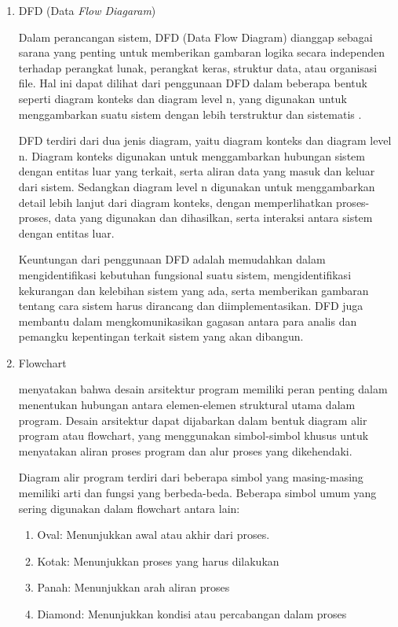\begin{enumerate}[leftmargin=1cm, itemindent=0.6cm,labelwidth=15pt, labelsep=5pt, listparindent=1cm,align=left]

    \item DFD (Data \textit{Flow Diagaram})

    Dalam perancangan sistem, DFD (Data Flow Diagram) dianggap sebagai sarana yang penting untuk memberikan gambaran logika secara independen terhadap perangkat lunak, perangkat keras, struktur data, atau organisasi file. Hal ini dapat dilihat dari penggunaan DFD dalam beberapa bentuk seperti diagram konteks dan diagram level n, yang digunakan untuk menggambarkan suatu sistem dengan lebih terstruktur dan sistematis \textcite{khotijah2016perancangan}.

    DFD terdiri dari dua jenis diagram, yaitu diagram konteks dan diagram level n. Diagram konteks digunakan untuk menggambarkan hubungan sistem dengan entitas luar yang terkait, serta aliran data yang masuk dan keluar dari sistem. Sedangkan diagram level n digunakan untuk menggambarkan detail lebih lanjut dari diagram konteks, dengan memperlihatkan proses-proses, data yang digunakan dan dihasilkan, serta interaksi antara sistem dengan entitas luar.

    Keuntungan dari penggunaan DFD adalah memudahkan dalam mengidentifikasi kebutuhan fungsional suatu sistem, mengidentifikasi kekurangan dan kelebihan sistem yang ada, serta memberikan gambaran tentang cara sistem harus dirancang dan diimplementasikan. DFD juga membantu dalam mengkomunikasikan gagasan antara para analis dan pemangku kepentingan terkait sistem yang akan dibangun.

    \item Flowchart

    menyatakan bahwa desain arsitektur program memiliki peran penting dalam menentukan hubungan antara elemen-elemen struktural utama dalam program. Desain arsitektur dapat dijabarkan dalam bentuk diagram alir program atau flowchart, yang menggunakan simbol-simbol khusus untuk menyatakan aliran proses program dan alur proses yang dikehendaki.

    Diagram alir program terdiri dari beberapa simbol yang masing-masing memiliki arti dan fungsi yang berbeda-beda. Beberapa simbol umum yang sering digunakan dalam flowchart antara lain:

    \begin{enumerate}
        \item Oval: Menunjukkan awal atau akhir dari proses.
        \item Kotak: Menunjukkan proses yang harus dilakukan
        \item Panah: Menunjukkan arah aliran proses
        \item Diamond: Menunjukkan kondisi atau percabangan dalam proses
    \end{enumerate}


\end{enumerate}
